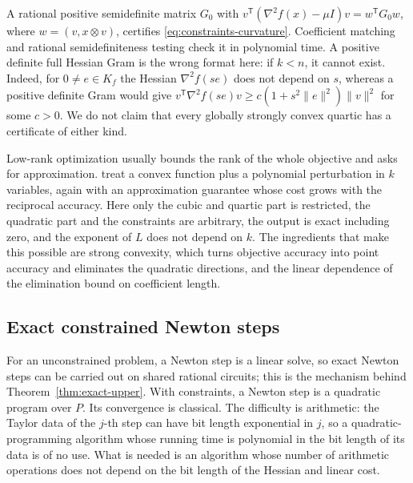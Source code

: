 \begin{remark}
\label{rem:constraints-psd-certificate}
A rational positive semidefinite matrix $G_0$ with
$v^{\mathsf T}(\nabla^2f(x)-\mu I)v=w^{\mathsf T}G_0w$, where
$w=(v,x\otimes v)$, certifies \eqref{eq:constraints-curvature}. Coefficient
matching and rational semidefiniteness testing check it in polynomial time.
A positive definite full Hessian Gram is the wrong format here: if $k<n$, it
cannot exist. Indeed, for $0\ne e\in K_f$ the Hessian $\nabla^2f(se)$ does not
depend on $s$, whereas a positive definite Gram would give
$v^{\mathsf T}\nabla^2f(se)v\ge c(1+s^2\|e\|^2)\|v\|^2$ for some $c>0$. We do
not claim that every globally strongly convex quartic has a certificate of
either kind.
\end{remark}

\begin{remark}
\label{rem:constraints-nonlinear-prior}
Low-rank optimization usually bounds the rank of the whole objective
\citep{MittalSchulz2013} and asks for approximation. \citet{KannanRademacher2009}
treat a convex function plus a polynomial perturbation in $k$ variables, again
with an approximation guarantee whose cost grows with the reciprocal
accuracy. Here only the cubic and quartic part is restricted, the quadratic
part and the constraints are arbitrary, the output is exact including zero,
and the exponent of $L$ does not depend on $k$. The ingredients that make this
possible are strong convexity, which turns objective accuracy into point
accuracy and eliminates the quadratic directions, and the linear dependence of
the elimination bound on coefficient length.
\end{remark}

\subsection{Exact constrained Newton steps}
\label{sec:constraints-newton}

For an unconstrained problem, a Newton step is a linear solve, so exact
Newton steps can be carried out on shared rational circuits; this is the
mechanism behind Theorem~\ref{thm:exact-upper}. With constraints, a Newton
step is a quadratic program over $P$. Its convergence is classical. The
difficulty is arithmetic: the Taylor data of the $j$-th step can have bit
length exponential in $j$, so a quadratic-programming algorithm whose running
time is polynomial in the bit length of its data is of no use. What is needed is an
algorithm whose number of arithmetic operations does not depend on the bit
length of the Hessian and linear cost.

